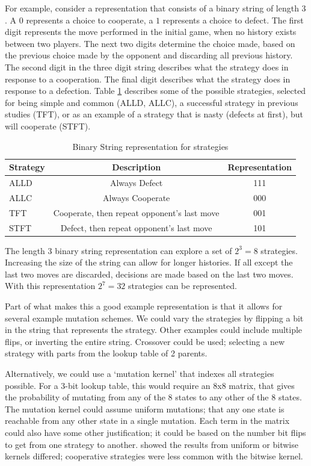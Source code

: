 \documentclass[a4paper,11pt,bcshonoursthesis,singlespace,oneside,thesisdraft,pdflatex]{cssethesis}
\begin{document}
For example, consider a representation that consists of a binary string of length 3 \citep{garcia:PLoSOne:2012}. A $0$ represents a choice to cooperate, a $1$ represents a choice to defect. 
The first digit represents the move performed in the initial game, when no history exists between two players. 
The next two digits determine the choice made, based on the previous choice made by the opponent and discarding all previous history. 
The second digit in the three digit string describes what the strategy does in response to a cooperation. 
The final digit describes what the strategy does in response to a defection. 
Table \ref{table:binaryStrategy} describes some of the possible strategies, selected for being simple and common (ALLD, ALLC), a successful strategy in previous studies (TFT), or as an example of a strategy that is nasty (defects at first), but will cooperate (STFT).

\begin{table}[h]
\centering
\captionsetup{justification=centering}
\begin{tabular}{|l|c|c|}
\hline
 Strategy & Description & Representation\\
\hline
ALLD & Always Defect & 111\\
\hline
ALLC & Always Cooperate & 000\\
\hline
TFT & Cooperate, then repeat opponent's last move & 001\\
\hline
STFT & Defect, then repeat opponent's last move & 101\\
\hline
\end{tabular}
\caption{Binary String representation for strategies}
\label{table:binaryStrategy}
\end{table}

The length 3 binary string representation can explore a set of $2^3=8$ strategies. Increasing the size of the string can allow for longer histories. 
If all except the last two moves are discarded, decisions are made based on the last two moves. 
With this representation $2^7=32$ strategies can be represented. 

Part of what makes this a good example representation is that it allows for several example mutation schemes. 
We could vary the strategies by flipping a bit in the string that represents the strategy. 
Other examples could include multiple flips, or inverting the entire string. 
Crossover could be used; selecting a new strategy with parts from the lookup table of 2 parents.

Alternatively, we could use a `mutation kernel' that indexes all strategies possible. 
For a 3-bit lookup table, this would require an 8x8 matrix, that gives the probability of mutating from any of the 8 states to any other of the 8 states. 
The mutation kernel could assume uniform mutations; that any one state is reachable from any other state in a single mutation. 
Each term in the matrix could also have some other justification; it could be based on the number bit flips to get from one strategy to another. 
\citet{garcia:PLoSOne:2012} showed the results from uniform or bitwise kernels differed; cooperative strategies were less common with the bitwise kernel. 
\end{document}
